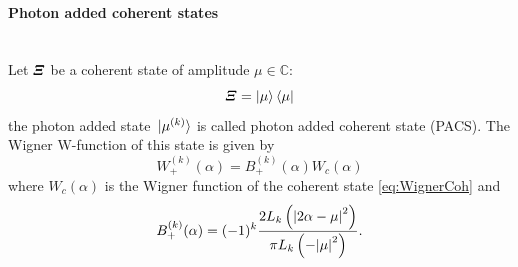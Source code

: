         \paragraph{Photon added coherent states}\mbox{}\\
        Let $\Operator{\varXi}$ be a coherent state of amplitude $\mu \in \mathbb{C}$: 
        \begin{equation*}
            \Operator{\varXi}=\ket{\mu}\bra{\mu}
        \end{equation*}
        the photon added state $\ket*{\mu^{(k)}}$ is called photon added coherent state
        (PACS).
        The Wigner W-function of this state is given by \cite{tesiGuerrini}
        \begin{equation}
            W_+^{(k)}(\alpha) = B_+^{(k)}(\alpha) W_c(\alpha)
        \end{equation}
        where $W_c(\alpha)$ is the Wigner function of the coherent state \ref{eq:WignerCoh} and
        \begin{equation}
            B_+^{(k)}(\alpha) = (-1)^k \frac{2 L_k \left( \absolutevalue{2\alpha-\mu}^2 \right)}
            {\pi L_k \left(-\absolutevalue{\mu}^2 \right)}.
            \label{eq:B_plus}
        \end{equation}


